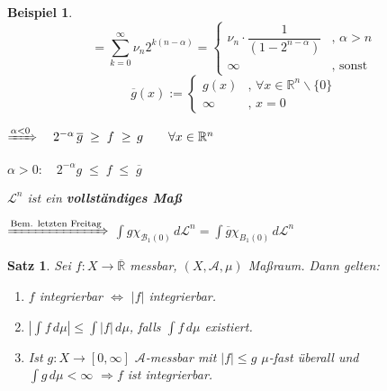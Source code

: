 \documentclass[11pt]{memoir}
\theoremstyle{changebreak}
\newtheorem{Beispiel}{Beispiel}[chapter]
\newtheorem{Satz}{Satz}[chapter]
\begin{document}
\begin{Beispiel}
\begin{equation}
= \sum\limits_{k=0}^\infty  \nu_n 2^{k(n-\alpha)} =
\begin{cases}
	\nu_n \cdotp \dfrac{1}{(1-2^{n-\alpha})} & ,\,\alpha > n \\
	\infty & , \text{ sonst}
\end{cases}
\end{equation}
\begin{equation}
\overline{g}(x) :=
\begin{cases}
	g(x) & ,\,\forall x \in \mathbb R^n \backslash \{0\} \\
	\infty & ,\,x = 0
\end{cases}
\end{equation}
\begin{center}
	$\xRightarrow{\alpha < 0} \quad2^{-\alpha}\,\overline{g} \;\geq \;f \;\geq\, g\qquad \forall x \in \mathbb R^n$ 
\end{center}
\begin{center}
	$\alpha > 0: \quad 2^{-\alpha}g \;\leq\; f \;\leq\; \overline g$ 
\end{center}
\par\bigskip
$\mathscr L^n$ ist ein \textbf{vollständiges Maß} 
\begin{center}
	$\xRightarrow{\text{Bem. letzten Freitag}}$ $\int g \chi_{\mathscr B_1 (0)} \,d\mathscr L^n = \int \overline g \chi_{B_1(0)}\, d\mathscr L^n$
\end{center}
\end{Beispiel}

\begin{Satz}
Sei $f: X \rightarrow \overline{\mathbb R}$ messbar, $(X, \mathscr A, \mu)$ Maßraum. Dann gelten:
\begin{enumerate}
	\item $f$ integrierbar $\Leftrightarrow$ $|f|$ integrierbar.
	\item $\left| \int f \,d\mu \right| \leq \int |f| \,d\mu$, falls $\int f \,d\mu$ existiert.
	\item Ist $g: X \rightarrow [0, \infty]$ $\mathscr A$-messbar mit $|f| \leq g$ $\mu$-fast überall und \\
	$\int g \, d\mu < \infty$ $\Rightarrow f$ ist integrierbar.
\end{enumerate}
\end{Satz}
\end{document}

